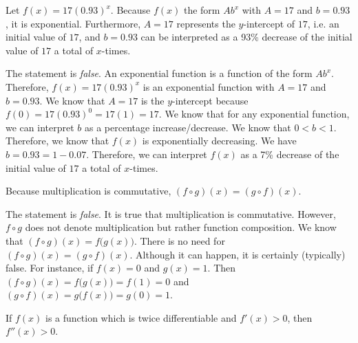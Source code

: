 \documentclass[11pt,letterpaper]{article}
\begin{document}
 Let $f(x)= 17(0.93)^x$. Because $f(x)$ the form $Ab^x$ with $A= 17$ and $b= 0.93$, it is exponential. Furthermore, $A= 17$ represents the $y$-intercept of $17$, i.e. an initial value of $17$, and $b= 0.93$ can be interpreted as a 93\% decrease of the initial value of $17$ a total of $x$-times. \pspace

\sol The statement is \textit{false}. An exponential function is a function of the form $Ab^x$. Therefore, $f(x)= 17(0.93)^x$ is an exponential function with $A= 17$ and $b= 0.93$. We know that $A= 17$ is the $y$-intercept because $f(0)= 17(0.93)^0= 17(1)= 17$. We know that for any exponential function, we can interpret $b$ as a percentage increase/decrease. We know that $0 < b < 1$. Therefore, we know that $f(x)$ is exponentially decreasing. We have $b= 0.93= 1 - 0.07$. Therefore, we can interpret $f(x)$ as a 7\% decrease of the initial value of $17$ a total of $x$-times. \pvspace{1.3cm}



\newpage



 Because multiplication is commutative, $(f \circ g)(x)= (g \circ f)(x)$. \pspace

\sol The statement is \textit{false}. It is true that multiplication is commutative. However, $f \circ g$ does not denote multiplication but rather function composition. We know that $(f \circ g)(x)= f \big( g(x) \big)$. There is no need for $(f \circ g)(x)= (g \circ f)(x)$. Although it can happen, it is certainly (typically) false. For instance, if $f(x)= 0$ and $g(x)= 1$. Then $(f \circ g)(x)= f \big( g(x) \big)= f(1)= 0$ and $(g \circ f)(x)= g \big( f(x) \big)= g(0)= 1$. \pvspace{1.3cm}



 If $f(x)$ is a function which is twice differentiable and $f'(x) > 0$, then $f''(x) > 0$. \pspace
\end{document}
